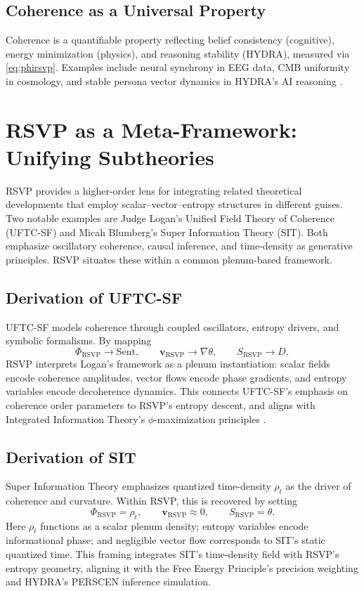 \documentclass[12pt]{report}
\begin{document}
\section{Coherence as a Universal Property}
Coherence is a quantifiable property reflecting belief consistency (cognitive), energy minimization (physics), and reasoning stability (HYDRA), measured via \eqref{eq:phirsvp}. Examples include neural synchrony in EEG data, CMB uniformity in cosmology, and stable persona vector dynamics in HYDRA’s AI reasoning \citep{RSVPMeta2025, HYDRA2025}.
\chapter{RSVP as a Meta-Framework: Unifying Subtheories}

RSVP provides a higher-order lens for integrating related theoretical developments that employ scalar--vector--entropy structures in different guises. Two notable examples are Judge Logan's Unified Field Theory of Coherence (UFTC-SF) and Micah Blumberg's Super Information Theory (SIT). Both emphasize oscillatory coherence, causal inference, and time-density as generative principles. RSVP situates these within a common plenum-based framework.

\section{Derivation of UFTC-SF}

UFTC-SF models coherence through coupled oscillators, entropy drivers, and symbolic formalisms. By mapping
\[
\Phi_{\text{RSVP}} \to \mathrm{Sent}, 
\qquad 
\mathbf{v}_{\text{RSVP}} \to \nabla \theta, 
\qquad 
S_{\text{RSVP}} \to D,
\]
RSVP interprets Logan’s framework as a plenum instantiation: scalar fields encode coherence amplitudes, vector flows encode phase gradients, and entropy variables encode decoherence dynamics.  
This connects UFTC-SF’s emphasis on coherence order parameters to RSVP’s entropy descent, and aligns with Integrated Information Theory’s $\phi$-maximization principles \citep{Tononi2016, Logan2025}.

\section{Derivation of SIT}

Super Information Theory emphasizes quantized time-density $\rho_t$ as the driver of coherence and curvature. Within RSVP, this is recovered by setting
\[
\Phi_{\text{RSVP}} = \rho_t, 
\qquad 
\mathbf{v}_{\text{RSVP}} \approx 0, 
\qquad 
S_{\text{RSVP}} = \theta.
\]
Here $\rho_t$ functions as a scalar plenum density; entropy variables encode informational phase; and negligible vector flow corresponds to SIT’s static quantized time.  
This framing integrates SIT’s time-density field with RSVP’s entropy geometry, aligning it with the Free Energy Principle’s precision weighting \citep{Friston2010, Blumberg2025} and HYDRA’s PERSCEN inference simulation.\citep{Du2025PERSCEN}
\end{document}
